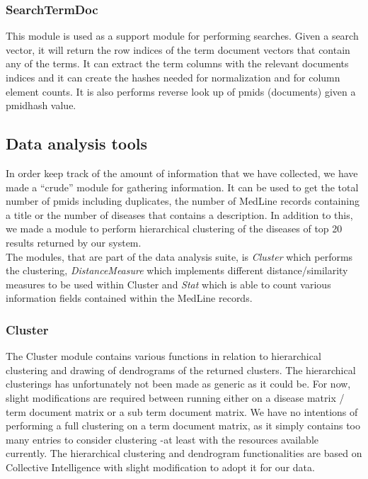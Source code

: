 \subsubsection{SearchTermDoc}
This module is used as a support module for performing searches. Given
a search vector, it will return the row indices of the term document
vectors that contain any of the terms. It can extract the term columns
with the relevant documents indices and it can create the hashes
needed for normalization and for column element counts. It is also
performs reverse look up of pmids (documents) given a pmidhash value.

\subsection{Data analysis tools}

In order keep track of the amount of information that we have
collected, we have made a ``crude'' module for gathering information. It
can be used to get the total number of pmids including duplicates, the
number of MedLine records containing a title or the number of diseases
that contains a description. In addition to this, we made a module to
perform hierarchical clustering of the diseases of top 20 results
returned by our system.\\

The modules, that are part of the data analysis suite, is
\textit{Cluster} which performs the clustering,
\textit{DistanceMeasure} which implements different
distance/similarity measures to be used within Cluster and
\textit{Stat} which is able to count various information fields
contained within the MedLine records.

\subsubsection{Cluster}
The Cluster module contains various functions in relation to
hierarchical clustering and drawing of dendrograms of the returned
clusters. The hierarchical clusterings has unfortunately not been made
as generic as it could be. For now, slight modifications are required
between running either on a disease matrix / term document matrix or a
sub term document matrix. We have no intentions of performing a full
clustering on a term document matrix, as it simply contains too many
entries to consider clustering -at least with the resources available
currently. The hierarchical clustering and dendrogram functionalities
are based on Collective Intelligence \cite{CollectiveIntelligence}
with slight modification to adopt it for our data.

